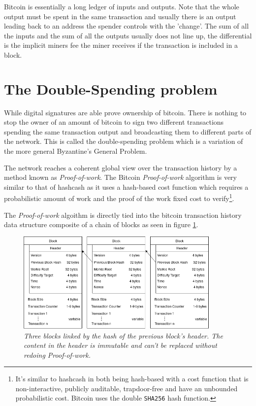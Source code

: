 Bitcoin is essentially a long ledger of inputs and outputs. Note that the whole output must be spent in the same transaction and usually there is an output leading back to an address the spender controls with the 'change'. The sum of all the inputs and the sum of all the outputs usually does not line up, the differential is the implicit miners fee the miner receives if the transaction is included in a block. 

\section{The Double-Spending problem}

While digital signatures are able prove ownership of bitcoin. There is nothing to stop the owner of an amount of bitcoin to sign two different transactions spending the same transaction output and broadcasting them to different parts of the network. This is called the double-spending problem which is a variation of the more general Byzantine's General Problem.


The network reaches a coherent global view over the transaction history by a method known as \textit{Proof-of-work}. The Bitcoin \textit{Proof-of-work} algorithm is very similar to that of hashcash as it uses a hash-based cost function which requires a probabilistic amount of work and the proof of the work fixed cost to verify\cite{back:hashcash}\footnote{It's similar to hashcash in both being hash-based with a cost function that is non-interactive, publicly auditable, trapdoor-free and have an unbounded probabilistic cost\cite{back:hashcash}.
Bitcoin uses the double \texttt{SHA256} hash function.}.

The \textit{Proof-of-work} algoithm is directly tied into the bitcoin transaction history data structure composite of a chain of blocks as seen in figure \ref{fig:blockchain}.

\begin{figure}[!htb]
	\hspace*{-0.4cm} 
	\centering
	\includegraphics[width=10cm]{images/blockchain.png}
	\caption{\textit{Three blocks linked by the hash of the previous block's header. The content in the header is immutable and can't be replaced without redoing \textit{Proof-of-work}.
	}}
	\label{fig:blockchain}
	\hspace{2mm} 
\end{figure}

